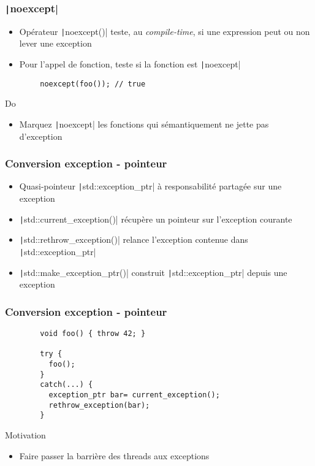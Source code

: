 \documentclass[C++.tex]{subfiles}
\begin{document}
\begin{frame}[fragile]
	\frametitle{\texttt|noexcept|}
	\begin{itemize}
		\item Opérateur \texttt|noexcept()| teste, au \textit{compile-time}, si une expression peut ou non lever une exception
		\item Pour l'appel de fonction, teste si la fonction est \texttt|noexcept|
	\end{itemize}

	\begin{verbatim}
		noexcept(foo()); // true
	\end{verbatim}

	\begin{exampleblock}{Do}
		\begin{itemize}
			\item Marquez \texttt|noexcept| les fonctions qui sémantiquement ne jette pas d'exception
		\end{itemize}
	\end{exampleblock}
\end{frame}

\begin{frame}[fragile]
	\frametitle{Conversion exception - pointeur}
	\begin{itemize}
		\item Quasi-pointeur \texttt|std::exception_ptr| à responsabilité partagée sur une exception
		\item \texttt|std::current_exception()| récupère un pointeur sur l'exception courante
		\item \texttt|std::rethrow_exception()| relance l'exception contenue dans \texttt|std::exception_ptr| 
		\item \texttt|std::make_exception_ptr()| construit \texttt|std::exception_ptr| depuis une exception
	\end{itemize}
\end{frame}

\begin{frame}[fragile]
	\frametitle{Conversion exception - pointeur}
	\begin{verbatim}
		void foo() { throw 42; }

		try {
		  foo();
		}
		catch(...) {
		  exception_ptr bar= current_exception();
		  rethrow_exception(bar);
		}
	\end{verbatim}

	\begin{block}{Motivation}
		\begin{itemize}
			\item Faire passer la barrière des threads aux exceptions
		\end{itemize}
	\end{block}
\end{frame}
\end{document}
